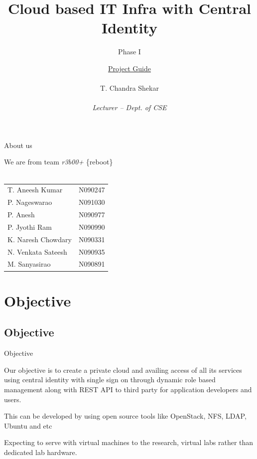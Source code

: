 \documentclass[xcolor=dvipsnames]{beamer}
\title[Cloud based IT Infra with Central Identity]{Cloud based IT Infra with Central Identity}
\subtitle{Phase I}
\author{ \underline{Project Guide} \\ \hspace{2mm} \\ \small{ T. Chandra Shekar } \tiny \\ \underline{} \\ \scriptsize \textit{Lecturer -- Dept. of CSE} }
\institute{ \underline{Presenting by} \\ \hspace{2mm} \\ \textit {Team r3b00+ }  \\ \hspace{4mm} \\ Dept. of CSE, RGUKT -- Nuzvid}
\begin{document}
\begin{frame}
\titlepage
\end{frame}

\begin{frame}{About us}

\small
\begin{center}
We are from team \textit{r3b00+}  \{reboot\} \\ \hspace{4cm} \\
\begin{tabular}{l  l }
T. Aneesh Kumar & N090247   \\
P. Nageswarao  & N091030  \\
P. Anesh  & N090977 \\
P. Jyothi Ram & N090990 \\
K. Naresh Chowdary  & N090331 \\
N. Venkata Sateesh  & N090935 \\
M. Sanyasirao & N090891  
\end{tabular}


\end{center}


\end{frame}
 
\setcounter{page}{1}
\section{Objective}
\subsection{Objective}
\begin{frame}{Objective}

Our objective is to create a  private cloud and availing access of all its services using central identity with single sign on through dynamic role based management along with REST API to third party for application developers and users. \newline

This can be developed by using open source tools like OpenStack, NFS, LDAP, Ubuntu and etc \newline

Expecting to serve with virtual machines to the research, virtual labs rather than dedicated lab hardware.
\end{frame}
\end{document}
